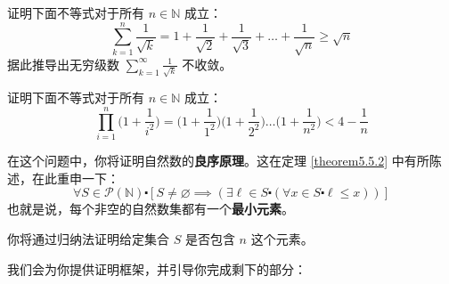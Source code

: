 \begin{exercise}
    证明下面不等式对于所有 $n \in \mathbb{N}$ 成立：
    \[\sum_{k=1}^{n} \frac{1}{\sqrt{k}} = 1+\frac{1}{\sqrt{2}}+\frac{1}{\sqrt{3}}+\dots+\frac{1}{\sqrt{n}} \ge \sqrt{n}\]
    据此推导出无穷级数 $\sum_{k=1}^{\infty} \frac{1}{\sqrt{k}}$ 不收敛。
\end{exercise}

\begin{exercise}
    证明下面不等式对于所有 $n \in \mathbb{N}$ 成立：
    \[\prod_{i=1}^{n} \Big(1+\frac{1}{i^2}\Big) = \Big(1+\frac{1}{1^2}\Big)\Big(1+\frac{1}{2^2}\Big) \dots \Big(1+\frac{1}{n^2}\Big) < 4-\frac{1}{n}\]
\end{exercise}

\begin{exercise}\label{exc:exercises5.7.21}
在这个问题中，你将证明自然数的\textbf{良序原理}。这在定理 \ref{theorem5.5.2} 中有所陈述，在此重申一下：
\[\forall S \in \mathcal{P}(\mathbb{N}) \centerdot [S \ne \varnothing \implies (\exists \ell \in S \centerdot (\forall x \in S \centerdot \ell \le x))]\]
也就是说，每个非空的自然数集都有一个\textbf{最小元素}。

你将通过归纳法证明给定集合 $S$ 是否包含 $n$ 这个元素。

我们会为你提供证明框架，并引导你完成剩下的部分：


\end{exercise}
